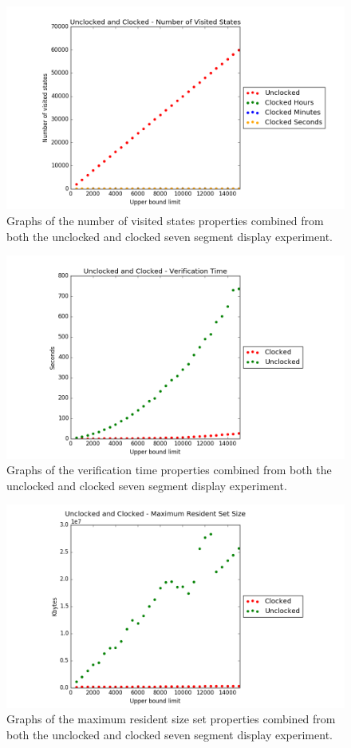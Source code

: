\begin{figure}
    \centering
    \includegraphics[scale=0.6]{./figures/plots/combined_states.png}
\caption{Graphs of the number of visited states properties combined from both the unclocked and clocked seven segment display experiment.}
\label{fig:combined_states}
\end{figure}

\begin{figure}
    \centering
    \includegraphics[scale=0.6]{./figures/plots/combined_verification_time.png}
\caption{Graphs of the verification time properties combined from both the unclocked and clocked seven segment display experiment.}
\label{fig:combined_verification}
\end{figure}

\begin{figure}
    \centering
    \includegraphics[scale=0.6]{./figures/plots/combined_size.png}
\caption{Graphs of the maximum resident size set properties combined from both the unclocked and clocked seven segment display experiment.}
\label{fig:combined_resident_size}
\end{figure}
